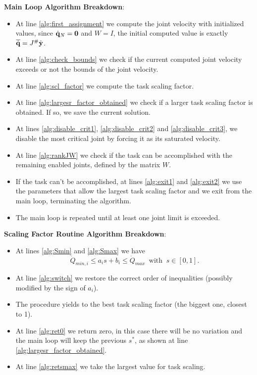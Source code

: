 \documentclass[10pt, a4paper]{report}
\begin{document}
\noindent\textbf{Main Loop Algorithm Breakdown}:\begin{itemize}
    \item At line \ref{alg:first_assignment} we compute the joint velocity with initialized values, since ${\dot{\mathbf q}}_N=\mathbf 0$ and $W=I$, the initial computed value is exactly $\overline{{\dot{\mathbf q}}}=J^\#{\dot{\mathbf y}}$.
    \item At line \ref{alg:check_bounds} we check if the current computed joint velocity exceeds or not the bounds of the joint velocity.
    \item At line \ref{alg:scl_factor} we compute the task scaling factor.
    \item At line \ref{alg:largesr_factor_obtained} we check if a larger task scaling factor is obtained. If so, we save the current solution.
    \item At lines \ref{alg:disable_crit1}, \ref{alg:disable_crit2} and \ref{alg:disable_crit3}, we disable the most critical joint by forcing it as its saturated velocity.
    \item At line \ref{alg:rankJW} we check if the task can be accomplished with the remaining enabled joints, defined by the matrix $W$.
    \item If the task can't be accomplished, at lines \ref{alg:exit1} and  \ref{alg:exit2} we use the parameters that allow the largest task scaling factor and we exit from the main loop, terminating the algorithm.
    \item The main loop is repeated until at least one joint limit is exceeded.
\end{itemize}
\noindent\textbf{Scaling Factor Routine Algorithm Breakdown}:\begin{itemize}
    \item At lines \ref{alg:Smin} and \ref{alg:Smax} we have\begin{equation}
        \dot Q_{min,i}\le a_is+b_i\le \dot Q_{max} \ \text{ with } \ s\in [0,1].
    \end{equation}
    \item At line \ref{alg:switch} we restore the correct order of inequalities (possibly modified by the sign of $a_i$).
    \item The procedure yields to the best task scaling factor (the biggest one, closest to 1).
    \item At line \ref{alg:ret0} we return zero, in this case there will be no variation and the main loop will keep the previous $s^*$, as shown at line \ref{alg:largesr_factor_obtained}.
    \item At line \ref{alg:retsmax} we take the largest value for task scaling.
\end{itemize}
\end{document}
